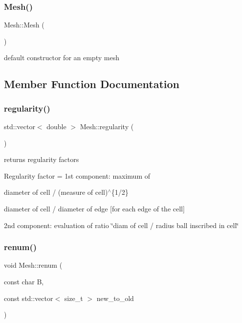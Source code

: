 \subsubsection{\texorpdfstring{Mesh()}{Mesh()}}
{\footnotesize\ttfamily Mesh\+::\+Mesh (\begin{DoxyParamCaption}{ }\end{DoxyParamCaption})}

default constructor for an empty mesh 

\subsection{Member Function Documentation}
\mbox{\label{classHArDCore2D_1_1Mesh_a530b237c8c966c21bdc3a16b4f266660}} 
\subsubsection{\texorpdfstring{regularity()}{regularity()}}
{\footnotesize\ttfamily std\+::vector$<$ double $>$ Mesh\+::regularity (\begin{DoxyParamCaption}{ }\end{DoxyParamCaption})}



returns regularity factors 

Regularity factor = 1st component\+: maximum of
\begin{DoxyItemize}
\item diameter of cell / (measure of cell)$^\wedge$\{1/2\}
\item diameter of cell / diameter of edge \mbox{[}for each edge of the cell\mbox{]}
\end{DoxyItemize}

2nd component\+: evaluation of ratio \char`\"{}diam of cell / radius ball inscribed in cell\char`\"{} \mbox{\label{classHArDCore2D_1_1Mesh_af77873bbc892a7a5b37bf4773c55aefc}} 
\subsubsection{\texorpdfstring{renum()}{renum()}}
{\footnotesize\ttfamily void Mesh\+::renum (\begin{DoxyParamCaption}\item[{const char}]{B,  }\item[{const std\+::vector$<$ size\+\_\+t $>$}]{new\+\_\+to\+\_\+old }\end{DoxyParamCaption})}



